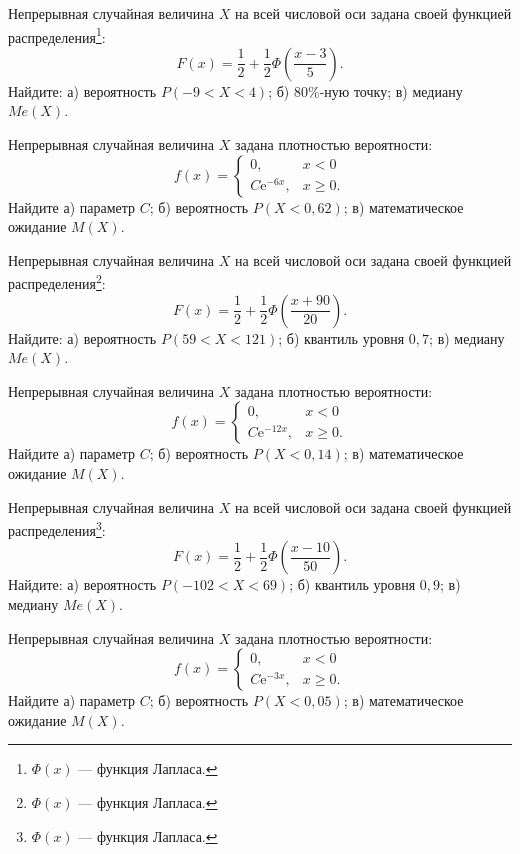 \vfill

\newpage\setcounter{zad}{0}

\z Непрерывная случайная величина $X$ на всей числовой оси задана своей функцией распределения\footnote{$\Phi(x)$ --- функция Лапласа.}: $$ F(x) = \frac{1}{2} + \frac{1}{2}\Phi\left( \frac{x - 3}{5} \right). $$ Найдите: а) вероятность $P(-9 < X < 4)$; б) $80\%$-ную точку; в) медиану $Me(X)$.


\vfill

\z Непрерывная случайная величина $X$ задана плотностью вероятности: $$ f(x) = \begin{cases}0, & x < 0 \\ C\mathrm{e}^{-6x}, & x \geqslant 0.\end{cases} $$ Найдите а) параметр $C$; б) вероятность $P(X < 0{,}62)$; в) математическое ожидание $M(X)$.
 

\vfill

\newpage\setcounter{zad}{0}

\z Непрерывная случайная величина $X$ на всей числовой оси задана своей функцией распределения\footnote{$\Phi(x)$ --- функция Лапласа.}: $$ F(x) = \frac{1}{2} + \frac{1}{2}\Phi\left( \frac{x + 90}{20} \right). $$ Найдите: а) вероятность $P(59 < X < 121)$; б) квантиль уровня $0{,}7$; в) медиану $Me(X)$.


\vfill

\z Непрерывная случайная величина $X$ задана плотностью вероятности: $$ f(x) = \begin{cases}0, & x < 0 \\ C\mathrm{e}^{-12x}, & x \geqslant 0.\end{cases} $$ Найдите а) параметр $C$; б) вероятность $P(X < 0{,}14)$; в) математическое ожидание $M(X)$.
 

\vfill

\newpage\setcounter{zad}{0}

\z Непрерывная случайная величина $X$ на всей числовой оси задана своей функцией распределения\footnote{$\Phi(x)$ --- функция Лапласа.}: $$ F(x) = \frac{1}{2} + \frac{1}{2}\Phi\left( \frac{x - 10}{50} \right). $$ Найдите: а) вероятность $P(-102 < X < 69)$; б) квантиль уровня $0{,}9$; в) медиану $Me(X)$.


\vfill

\z Непрерывная случайная величина $X$ задана плотностью вероятности: $$ f(x) = \begin{cases}0, & x < 0 \\ C\mathrm{e}^{-3x}, & x \geqslant 0.\end{cases} $$ Найдите а) параметр $C$; б) вероятность $P(X < 0{,}05)$; в) математическое ожидание $M(X)$.
 

